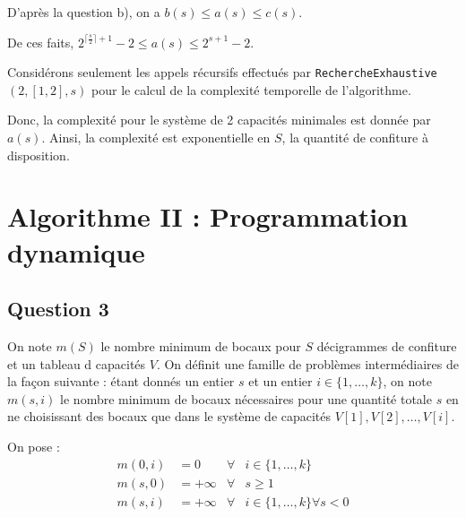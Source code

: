 \documentclass[12pt,a4paper]{article}
\begin{document}
\begin{enumerate}[a)]
D'apr\`es la question b), on a $ b(s) \leq a(s) \leq c(s) $. 

De ces faits, $ 2^{\lceil \frac{s}{2} \rceil + 1} - 2 \leq a(s) \leq 2^{s+1} - 2 $.

Consid\'erons seulement les appels r\'ecursifs effectu\'es par \texttt{RechercheExhaustive}$(2,[1,2],s)$ pour le calcul de la complexit\'e temporelle de l'algorithme.

Donc, la complexit\'e pour le syst\`eme de 2 capacit\'es minimales est donn\'ee par $a(s)$. Ainsi, la complexit\'e est exponentielle en $S$, la quantit\'e de confiture \`a disposition. 

\end{enumerate}

\section{Algorithme II : Programmation dynamique}

\subsection*{Question 3}
On note $m(S)$ le nombre minimum de bocaux pour $S$ d\'ecigrammes de confiture et un tableau d capacit\'es $V$. On d\'efinit une famille de probl\`emes interm\'ediaires de la fa\c{c}on suivante : \'etant donn\'es un entier $s$ et un entier $i \in \{1, \dotsc, k\}$, on note $m(s,i)$ le nombre minimum de bocaux n\'ecessaires pour une quantit\'e totale $s$ en ne choisissant des bocaux que dans le syst\`eme de capacit\'es $V[1],V[2],\dotsc,V[i]$.

On pose :
\begin{align*}
 m(0,i) &= 0 & \forall & i \in \{1,\dotsc, k\} \\
 m(s,0) &= +\infty & \forall & s \geq 1 \\
 m(s,i) &= + \infty & \forall & i \in \{1,\dotsc,k\} \forall s < 0
\end{align*}
\end{document}
